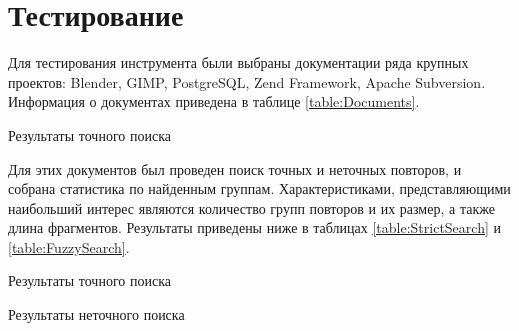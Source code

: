 \documentclass[14pt]{matmex-diploma-custom}
\begin{document}



\section{Тестирование}

Для тестирования инструмента были выбраны документации ряда крупных проектов: Blender, GIMP, PostgreSQL, Zend Framework, Apache Subversion. Информация о документах приведена в таблице \ref{table:Documents}. 

\begin{table}[h!]
	\centering
	
	\caption{Результаты точного поиска}
	\label{table:Documents}
\end{table}

Для этих документов был проведен поиск точных и неточных повторов, и собрана статистика по найденным группам. Характеристиками, представляющими наибольший интерес являются количество групп повторов и их размер, а также длина фрагментов. Результаты приведены ниже в таблицах \ref{table:StrictSearch} и \ref{table:FuzzySearch}.

\begin{table}[ht!]
	\centering
	
	\caption{Результаты точного поиска}
	\label{table:StrictSearch}
\end{table}

\begin{table}[ht!]
	\centering
	
	\caption{Результаты неточного поиска}
	\label{table:FuzzySearch}
\end{table}
\end{document}
